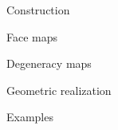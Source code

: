 \documentclass[../main.tex]{subfiles}
\begin{document}
    Construction
            
    Face maps
    
    Degeneracy maps
    
    Geometric realization
    
    Examples
\end{document}

